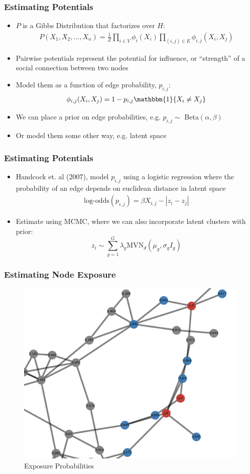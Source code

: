 \documentclass[
	11pt, %
]{beamer}
\begin{document}
\begin{frame}
	\frametitle{Estimating Potentials}
	\begin{itemize}
		\item $P$ is a Gibbs Distribution that factorizes over $H$: \begin{align*}
			P(X_1, X_2, \dots, X_n) = \frac{1}{Z} \prod_{i \in V} \phi_i(X_i)\prod_{(i, j) \in E}\phi_{i,j}(X_i, X_j) 
		\end{align*}
		\item Pairwise potentials represent the potential for influence, or ``strength'' of a social connection between two nodes
		\item Model them as a function of edge probability, $p_{i,j}$: \begin{align*}
			\phi_{i,j}(X_i, X_j) = 1 - p_{i,j}\mathbbm{1}\{{X_i \neq X_j}\}
		\end{align*}
		\item We can place a prior on edge probabilities, e.g. $p_{i,j} \sim $ Beta$(\alpha, \beta)$
		\item Or model them some other way, e.g. latent space 
	\end{itemize}
\end{frame}

\begin{frame}
	\frametitle{Estimating Potentials}
	\begin{itemize}
		\item Handcock et. al (2007), model $p_{i,j}$ using a logistic regression where the probability of an edge depends on euclidean distance in latent space \begin{align*}
			\mbox{log-odds}(p_{i,j}) = \beta X_{i,j} - |z_i - z_j|
		\end{align*}
		\item Estimate using MCMC, where we can also incorporate latent clusters with prior: \begin{displaymath}
		z_i \sim \sum_{g = 1}^{G}\lambda_g \mbox{MVN}_d(\mu_g, \sigma_gI_g) 
	  \end{displaymath}
	\end{itemize}
\end{frame}


\begin{frame}
	\frametitle{Estimating Node Exposure}
	\begin{figure}
		\includegraphics[width=0.7\linewidth]{example.png}
		\caption{Exposure Probabilities}
	\end{figure}
\end{frame}
\end{document}
